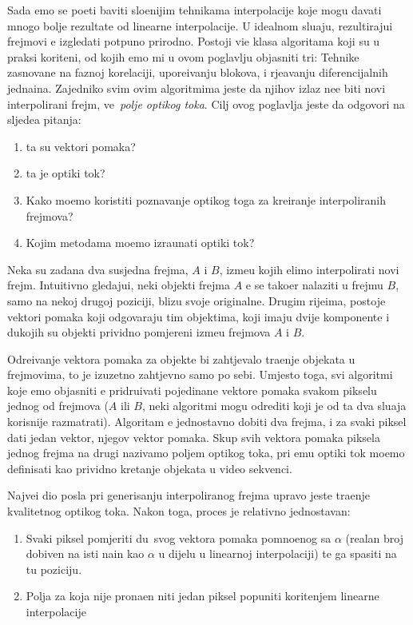 Sada \cj emo se po\ch eti baviti slo\zh enijim tehnikama interpolacije koje mogu davati mnogo bolje rezultate od linearne interpolacije. U idealnom slu\ch aju, rezultiraju\cj i frejmovi \cj e izgledati potpuno prirodno.
Postoji vi\sh e klasa algoritama koji su u praksi kori\sh teni, od kojih \cj emo mi u ovom poglavlju objasniti tri: Tehnike zasnovane na faznoj korelaciji, upore\dj ivanju blokova, i rje\sh avanju diferencijalnih jedna\ch ina. %
Zajedni\ch ko svim ovim algoritmima jeste da njihov izlaz ne\cj e biti novi interpolirani frejm, ve\cj\ \textit{polje opti\ch kog toka}.
Cilj ovog poglavlja jeste da odgovori na sljede\cj a pitanja:
\begin{enumerate}
\item \SH ta su vektori pomaka?
\item \SH ta je opti\ch ki tok?
\item Kako mo\zh emo koristiti poznavanje opti\ch kog toga za kreiranje interpoliranih frejmova?
\item Kojim metodama mo\zh emo izra\ch unati opti\ch ki tok?
\end{enumerate}

Neka su zadana dva susjedna frejma, $A$ i $B$, izme\dj u kojih \zh elimo interpolirati novi frejm. Intuitivno gledaju\cj i, neki objekti frejma $A$ \cj e se tako\dj er nalaziti u frejmu $B$, samo na nekoj drugoj poziciji, blizu
svoje originalne. Drugim rije\ch ima, postoje vektori pomaka koji odgovaraju tim objektima, koji imaju dvije komponente i du\zh kojih su objekti prividno pomjereni izme\dj u frejmova $A$ i $B$.

Odre\dj ivanje vektora pomaka za objekte bi zahtjevalo tra\zh enje objekata u frejmovima, \sh to je izuzetno zahtjevno samo po sebi. Umjesto toga, svi algoritmi koje \cj emo objasniti \cj e pridru\zh ivati pojedina\ch ne
vektore pomaka svakom pikselu jednog od frejmova ($A$ ili $B$, neki algoritmi mogu odrediti koji je od ta dva slu\ch aja korisnije razmatrati). Algoritam \cj e jednostavno dobiti dva frejma, i za svaki piksel dati jedan
vektor, njegov vektor pomaka. Skup svih vektora pomaka piksela jednog frejma na drugi nazivamo poljem opti\ch kog toka, pri \ch emu opti\ch ki tok mo\zh emo definisati kao prividno kretanje objekata u video
sekvenci.

Najve\cj i dio posla pri generisanju interpoliranog frejma upravo jeste tra\zh enje kvalitetnog opti\ch kog toka. Nakon toga, proces je relativno jednostavan:
\begin{enumerate}
\item Svaki piksel pomjeriti du\zh\ svog vektora pomaka pomno\zh enog sa $\alpha$ (realan broj dobiven na isti na\ch in kao $\alpha$ u dijelu u linearnoj interpolaciji) te ga spasiti na tu poziciju.
\item Polja za koja nije prona\dj en niti jedan piksel popuniti kori\sh tenjem linearne interpolacije
\end{enumerate}